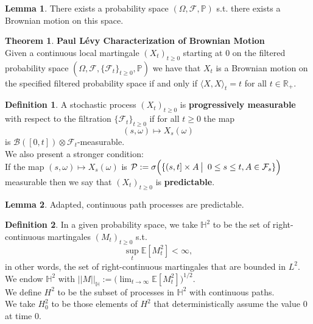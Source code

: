 \documentclass[12pt]{article}
\newcommand{\cB}{\mathcal{B}}
\newcommand{\cF}{\mathcal{F}}
\newcommand{\cP}{\mathcal{P}}
\newcommand{\E}{\mathbb{E}}
\newcommand{\R}{\mathbb{R}}
\newcommand{\bH}{\mathbb{H}}
\newcommand{\Prb}{\mathbb{P}}
\newcommand{\quantifyspace}{\hspace{2px} \big | \hspace{5px}}
\newcommand{\PS}{(\Omega, \cF, \Prb)}
\newcommand{\cFPS}{(\Omega, \cF, \{ \cF_t\}_{t \geq 0}, \Prb)}
\newcommand{\cFi}{\{\cF_t\}_{t \geq 0}}
\newcommand{\la}{\langle}
\newcommand{\ra}{\rangle}
\newcommand{\norm}[2]{||#1||_{#2}}
\theoremstyle{definition}
\newtheorem{defn}{Definition}
\newtheorem{thm}{Theorem}
\newtheorem{lemma}{Lemma}
\begin{document}
\begin{lemma}
    There exists a probability space $\PS$ s.t. there exists a Brownian motion on this space.
\end{lemma}

\begin{thm}
    \textbf{Paul Lévy Characterization of Brownian Motion} \cite{revuz1990} \\
    Given a continuous local martingale $(X_t)_{t \geq 0}$ starting at 0 on the filtered probability space $\cFPS$ we have that %
    $X_t$ is a Brownian motion on the specified filtered probability space if and only if  $\la X, X \ra_t = t$ for all $t \in \R_+$.

\end{thm}

\begin{defn}
    A stochastic process $(X_t)_{t \geq 0}$ is \textbf{progressively measurable} with respect to the filtration $\cFi$ if for all $t \geq 0$
    the map
    \[
        (s, \omega) \longmapsto X_s(\omega)
    \]
    is $\cB([0,t]) \otimes \cF_t$-measurable. \\
    We also present a stronger condition: \\
    If the map $(s, \omega) \mapsto X_s(\omega)$ is $\cP := \sigma \Big ( \{ (s, t] \times A \quantifyspace 0 \leq s \leq t, A \in \cF_s \} \Big )$ measurable
    then we say that $(X_t)_{t \geq 0}$ is \textbf{predictable}.
\end{defn}

\begin{lemma}
    Adapted, continuous path processes are predictable.
\end{lemma}

\begin{defn}
    In a given probability space, we take $\bH^2$ to be the set of right-continuous martingales $(M_t)_{t \geq 0}$ s.t.
    \[
        \sup_t \E[M_t^2] < \infty,
    \]
    in other words, the set of right-continuous martingales that are bounded in $L^2$. \\
    We endow $\bH^2$ with $\norm{M}{\bH} := \big ( \lim_{t \to \infty} \E[M_t^2] \big )^{1/2}$. \\
    We define $H^2$ to be the subset of processes in $\bH^2$ with continuous paths. \\
    We take $H^2_0$ to be those elements of $H^2$ that deterministically assume the value 0 at time 0. \\
\end{defn}
\end{document}
